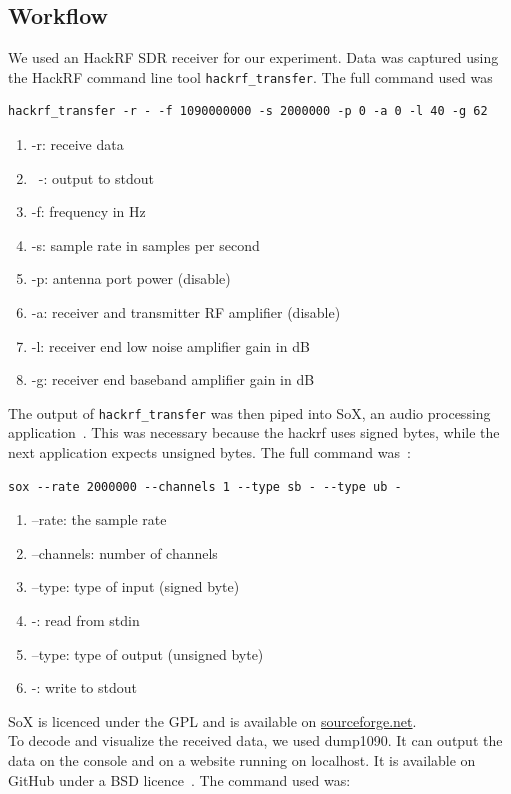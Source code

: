 \documentclass[conference]{IEEEtran}
\begin{document}
\subsection{Workflow}
We used an HackRF SDR receiver for our experiment. Data was captured using the HackRF command line tool \lstinline|hackrf_transfer|. The full command used was
\begin{lstlisting}
hackrf_transfer -r - -f 1090000000 -s 2000000 -p 0 -a 0 -l 40 -g 62
\end{lstlisting}
\begin{enumerate}
	\item -r: receive data
	\item ~-: output to stdout
	\item -f: frequency in Hz
	\item -s: sample rate in samples per second
	\item -p: antenna port power (disable)
	\item -a: receiver and transmitter RF amplifier (disable)
	\item -l: receiver end low noise amplifier gain in dB
	\item -g: receiver end baseband amplifier gain in dB
\end{enumerate}
The output of \lstinline|hackrf_transfer| was then piped into SoX, an audio processing application~\cite{SoX19}. This was necessary because the hackrf uses signed bytes, while the next application expects unsigned bytes. The full command was~\cite{Medium19ADS-B}:
\begin{lstlisting}
sox --rate 2000000 --channels 1 --type sb - --type ub -
\end{lstlisting}
\begin{enumerate}
	\item --rate: the sample rate
	\item --channels: number of channels
	\item --type: type of input (signed byte)
	\item -: read from stdin
	\item --type: type of output (unsigned byte)
	\item -: write to stdout
\end{enumerate}
SoX is licenced under the GPL and is available on \url{sourceforge.net}.\\
To decode and visualize the received data, we used dump1090. It can output the data on the console and on a website running on localhost. It is available on GitHub under a BSD licence~\cite{dump109019Github}. The command used was:
\end{document}
